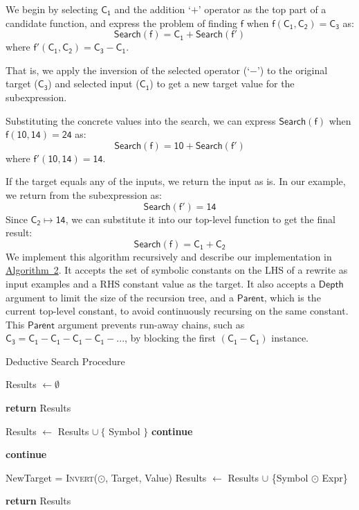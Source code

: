 \documentclass[review, anonymous, acmsmall]{acmart}
\newcommand{\blockmath}[1]{\[\mathsf{#1}\]}
\newcommand{\inline}[1]{$\mathsf{#1}$}
\begin{document}
We begin by selecting \inline{C_1} and the addition `\inline{+}' operator as the top part of a candidate function, and express the problem of finding \inline{f} when \inline{f(C_1, C_2) = C_3} as:
   \blockmath{Search(f) = C_1 + Search(f')}
where \inline{f'(C_1, C_2) = C_3 - C_1}.

That is, we apply the inversion of the selected operator (`\inline{-}') to the original target (\inline{C_3}) and selected input (\inline{C_1}) to get a new target value for the subexpression. 

Substituting the concrete values into the search, we can express \inline{Search(f)} when \inline{f(10, 14) = 24} as:
      \blockmath{Search(f) = 10 + Search(f')}
where \inline{f'(10, 14) = 14}.

If the target equals any of the inputs, we return the input as is. In our example, we return from the subexpression as:
    \blockmath{Search(f') = 14}
Since \inline{C_2 \mapsto 14}, we can substitute it into our top-level function to get the final result:
\blockmath{Search(f) = C_1 + C_2}
We implement this algorithm recursively and describe our implementation in \hyperref[alg:deductive]{Algorithm~2}. It accepts the set of symbolic constants on the LHS of a rewrite as input examples and a RHS constant value as the target. It also accepts a \inline{Depth} argument to limit the size of the recursion tree, and a \inline{Parent}, which is the current top-level constant, to avoid continuously recursing on the same constant. This \inline{Parent} argument prevents run-away chains, such as \inline{C_3 = C_1 - C_1 - C_1 - C_1 - ...}, by blocking the first \inline{(C_1 - C_1)} instance. 


\begin{algorithm}
\caption{Deductive Search Procedure}\label{alg:deductive}
\begin{algorithmic}[1]
\State Results \inline{\gets \emptyset} 

\State \textbf{return} Results
\EndIf

     
    \State Results $\gets$ Results $\cup\ \{$ Symbol $\}$
    \State \textbf{continue}
    \EndIf

     \Comment{Prevent run-away chains like \inline{C - C}.}
    \State \textbf{continue}
    \EndIf

     
       \State NewTarget = \textsc{Invert}(\inline{\odot}, Target, Value)
        \State Results $\gets$ Results $\cup$ \{Symbol $\odot$ Expr\}      
        \EndFor
    \EndFor
\EndFor

\State \textbf{return} Results
\EndProcedure
\end{algorithmic}
\end{algorithm}
\end{document}

